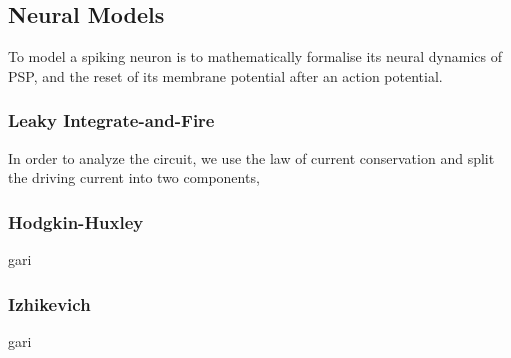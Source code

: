 \subsection{Neural Models}
To model a spiking neuron is to mathematically formalise its neural dynamics of PSP, and the reset of its membrane potential after an action potential.

\subsubsection{Leaky Integrate-and-Fire}
In order to analyze the circuit, we use the law of current conservation and split the driving current into two components,
%
%
%

\subsubsection{Hodgkin-Huxley}
gari

\subsubsection{Izhikevich}
gari
 
 
